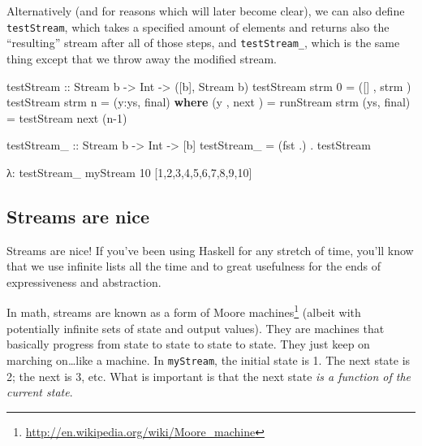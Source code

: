 \documentclass[]{article}
\newenvironment{Shaded}{}{}
\newcommand{\KeywordTok}[1]{\textcolor[rgb]{0.00,0.44,0.13}{\textbf{{#1}}}}
\newcommand{\DataTypeTok}[1]{\textcolor[rgb]{0.56,0.13,0.00}{{#1}}}
\newcommand{\DecValTok}[1]{\textcolor[rgb]{0.25,0.63,0.44}{{#1}}}
\newcommand{\OtherTok}[1]{\textcolor[rgb]{0.00,0.44,0.13}{{#1}}}
\newcommand{\FunctionTok}[1]{\textcolor[rgb]{0.02,0.16,0.49}{{#1}}}
\newcommand{\NormalTok}[1]{{#1}}
\renewcommand{\href}[2]{#2\footnote{\url{#1}}}
\begin{document}
Alternatively (and for reasons which will later become clear), we can
also define \texttt{testStream}, which takes a specified amount of
elements and returns also the ``resulting'' stream after all of those
steps, and \texttt{testStream\_}, which is the same thing except that we
throw away the modified stream.

\begin{Shaded}
\begin{Highlighting}[]
\OtherTok{testStream ::} \DataTypeTok{Stream} \NormalTok{b }\OtherTok{->} \DataTypeTok{Int} \OtherTok{->} \NormalTok{([b], }\DataTypeTok{Stream} \NormalTok{b)}
\NormalTok{testStream strm }\DecValTok{0} \FunctionTok{=} \NormalTok{([]  , strm )}
\NormalTok{testStream strm n }\FunctionTok{=} \NormalTok{(y}\FunctionTok{:}\NormalTok{ys, final)}
  \KeywordTok{where}
    \NormalTok{(y , next )   }\FunctionTok{=} \NormalTok{runStream  strm}
    \NormalTok{(ys, final)   }\FunctionTok{=} \NormalTok{testStream next (n}\FunctionTok{-}\DecValTok{1}\NormalTok{)}

\OtherTok{testStream_ ::} \DataTypeTok{Stream} \NormalTok{b }\OtherTok{->} \DataTypeTok{Int} \OtherTok{->} \NormalTok{[b]}
\NormalTok{testStream_ }\FunctionTok{=} \NormalTok{(fst }\FunctionTok{.}\NormalTok{) }\FunctionTok{.} \NormalTok{testStream}
\end{Highlighting}
\end{Shaded}

\begin{Shaded}
\begin{Highlighting}[]
\NormalTok{λ}\FunctionTok{:} \NormalTok{testStream_ myStream }\DecValTok{10}
\NormalTok{[}\DecValTok{1}\NormalTok{,}\DecValTok{2}\NormalTok{,}\DecValTok{3}\NormalTok{,}\DecValTok{4}\NormalTok{,}\DecValTok{5}\NormalTok{,}\DecValTok{6}\NormalTok{,}\DecValTok{7}\NormalTok{,}\DecValTok{8}\NormalTok{,}\DecValTok{9}\NormalTok{,}\DecValTok{10}\NormalTok{]}
\end{Highlighting}
\end{Shaded}

\subsection{Streams are nice}\label{streams-are-nice}

Streams are nice! If you've been using Haskell for any stretch of time,
you'll know that we use infinite lists all the time and to great
usefulness for the ends of expressiveness and abstraction.

In math, streams are known as a form of
\href{http://en.wikipedia.org/wiki/Moore_machine}{Moore machines}
(albeit with potentially infinite sets of state and output values). They
are machines that basically progress from state to state to state to
state. They just keep on marching on\ldots{}like a machine. In
\texttt{myStream}, the initial state is 1. The next state is 2; the next
is 3, etc. What is important is that the next state \emph{is a function
of the current state}.
\end{document}
